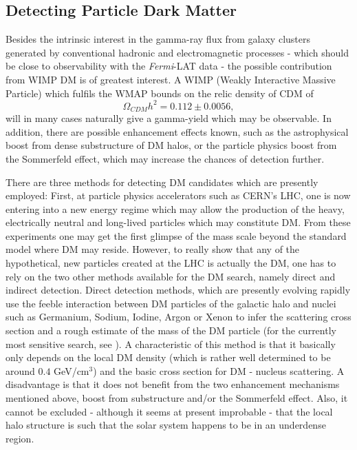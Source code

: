\documentclass[10pt,aps,pra,reprint,amsmath,amsfonts,amssymb,showpacs,nofootinbib,floatfix]{revtex4-1}
\newcommand{\Fermi}{{\em Fermi}\xspace}
\begin{document}
\subsection{Detecting Particle Dark Matter}
\label{sect:PF}
Besides the intrinsic interest in the gamma-ray flux from galaxy
clusters generated by conventional hadronic and electromagnetic
processes - which should be close to observability with the \Fermi-LAT
data
\cite{1997ApJ...487..529B,2007A&A...473...41E,2010MNRAS.409..449P} -
the possible contribution from WIMP DM is of greatest interest. A WIMP
(Weakly Interactive Massive Particle) which fulfils the WMAP bounds on
the relic density of CDM of \cite{Komatsu:2010fb}
$$\Omega_{CDM}h^2=0.112\pm 0.0056,$$ will in many cases naturally give
a gamma-yield which may be observable. In addition, there are possible
enhancement effects known, such as the astrophysical boost from dense
substructure of DM halos, or the particle physics boost from the
Sommerfeld effect, which may increase the chances of detection
further.

There are three methods for detecting DM candidates which are
presently employed: First, at particle physics accelerators such as
CERN's LHC, one is now entering into a new energy regime which may
allow the production of the heavy, electrically neutral and long-lived
particles which may constitute DM. From these experiments one may get
the first glimpse of the mass scale beyond the standard model where DM
may reside. However, to really show that any of the hypothetical, new
particles created at the LHC is actually the DM, one has to rely on
the two other methods available for the DM search, namely direct and
indirect detection. Direct detection methods, which are presently
evolving rapidly use the feeble interaction between DM particles of
the galactic halo and nuclei such as Germanium, Sodium, Iodine, Argon
or Xenon to infer the scattering cross section and a rough estimate of
the mass of the DM particle (for the currently most sensitive search,
see \cite{Aprile:2010um,Aprile:2011hi}). A characteristic of this
method is that it basically only depends on the local DM density
(which is rather well determined to be around $0.4$ GeV/cm$^3$) and
the basic cross section for DM - nucleus scattering. A disadvantage is
that it does not benefit from the two enhancement mechanisms mentioned
above, boost from substructure and/or the Sommerfeld effect. Also, it
cannot be excluded - although it seems at present improbable - that
the local halo structure is such that the solar system happens to be
in an underdense region.
\end{document}
